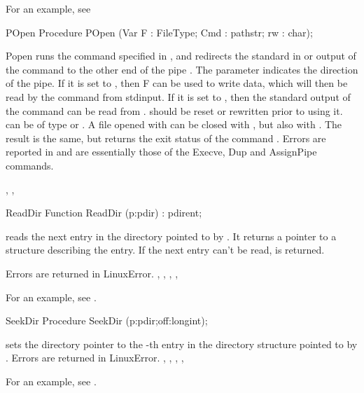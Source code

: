 For an example, see 
\begin{procedure}{POpen}
\Declaration
Procedure POpen (Var F : FileType; Cmd : pathstr; rw : char);

\Description
 Popen runs the command specified in ,
 and redirects the standard in or output of the
command to the other end of the pipe . The parameter 
indicates the direction of the pipe. If it is set to , then F can
be used to write data, which will then be read by the command from stdinput.
If it is set to , then the standard output of the command can be 
read from .  should be reset or rewritten prior to using it.
 can be of type  or .
A file opened with  can be closed with , but also
with . The result is the same, but  returns the
exit status of the command .
\Errors
Errors are reported in  and are essentially those of the
Execve, Dup and AssignPipe commands.

\SeeAlso
{}, , 
\end{procedure}
\html{}
\begin{function}{ReadDir}
\Declaration
Function ReadDir (p:pdir) : pdirent;

\Description
{} reads the next entry in the directory pointed to by .
It returns a  pointer to a structure describing the entry.
If the next entry can't be read,  is returned.

\Errors
Errors are returned in LinuxError.
\SeeAlso
{}, , , ,
\end{function}
For an example, see .
\begin{procedure}{SeekDir}
\Declaration
Procedure SeekDir (p:pdir;off:longint);

\Description
  sets the directory pointer to the -th entry in the
directory structure pointed to by .
\Errors
Errors are returned in LinuxError.
\SeeAlso
{}, , , ,
\end{procedure}
For an example, see .
